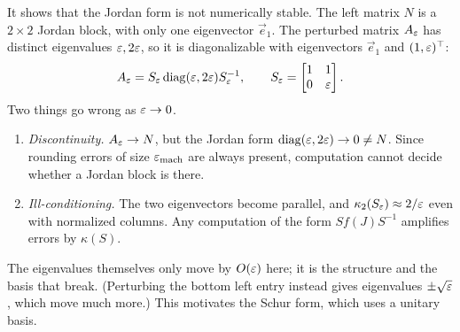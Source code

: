   \label{q:jordan-example}
\end{question}

\begin{answer}
  It shows that the Jordan form is not numerically stable. The left matrix $N$ is a $2 \times 2$ Jordan block, with only one eigenvector $\vec{e}_1$. The perturbed matrix $A_\varepsilon$ has distinct eigenvalues $\varepsilon, 2\varepsilon$, so it is diagonalizable with eigenvectors $\vec{e}_1$ and $(1, \varepsilon)^\top$:
  \begin{equation}
    A_\varepsilon = S_\varepsilon\operatorname{diag}(\varepsilon, 2\varepsilon)S_\varepsilon^{-1}, \qquad S_\varepsilon = \begin{bmatrix} 1 & 1 \\ 0 & \varepsilon \end{bmatrix}.
  \end{equation}
  Two things go wrong as $\varepsilon \to 0$.
  \begin{enumerate}
    \item \emph{Discontinuity.} $A_\varepsilon \to N$, but the Jordan form $\operatorname{diag}(\varepsilon, 2\varepsilon) \to 0 \ne N$. Since rounding errors of size $\varepsilon_{\mathrm{mach}}$ are always present, computation cannot decide whether a Jordan block is there.
    \item \emph{Ill-conditioning.} The two eigenvectors become parallel, and $\kappa_2(S_\varepsilon) \approx 2/\varepsilon$ even with normalized columns. Any computation of the form $Sf(J)S^{-1}$ amplifies errors by $\kappa(S)$.
  \end{enumerate}
  The eigenvalues themselves only move by $O(\varepsilon)$ here; it is the structure and the basis that break. (Perturbing the bottom left entry instead gives eigenvalues $\pm\sqrt{\varepsilon}$, which move much more.) This motivates the Schur form, which uses a unitary basis.
\end{answer}
